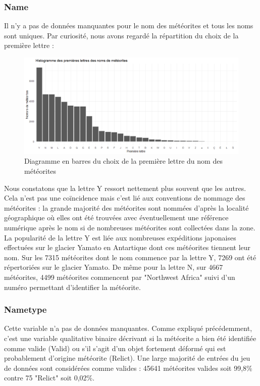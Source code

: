 \documentclass[12pt]{article}
\begin{document}
\subsubsection*{Name}
Il n'y a pas de données manquantes pour le nom des météorites et tous les noms sont uniques. Par curiosité, nous avons regardé la répartition du choix de la première lettre :
\begin{figure}[H]
\centering
\includegraphics[width=16cm]{Images/exploration/name_barplot_lettres.png}
\caption{Diagramme en barres du choix de la première lettre du nom des météorites}
\end{figure}
Nous constatons que la lettre Y ressort nettement plus souvent que les autres. Cela n'est pas une coïncidence mais c'est lié aux conventions de nommage des météorites \cite{Convention_nommage_meteorites} : la grande majorité des météorites sont nommées d'après la localité géographique où elles ont été trouvées avec éventuellement une référence numérique après le nom si de nombreuses météorites sont collectées dans la zone. La popularité de la lettre Y est liée aux nombreuses expéditions japonaises effectuées sur le glacier Yamato en Antartique dont ces météorites tiennent leur nom. Sur les 7315 météorites dont le nom commence par la lettre Y, 7269 ont été répertoriées sur le glacier Yamato. De même pour la lettre N, sur 4667 météorites, 4499 météorites commencent par "Northwest Africa" suivi d'un numéro permettant d'identifier la météorite.
\subsubsection*{Nametype}
Cette variable n'a pas de données manquantes. Comme expliqué précédemment, c'est une variable qualitative binaire décrivant si la météorite a bien été identifiée comme valide (Valid) ou s'il s'agit d'un objet fortement déformé qui est probablement d'origine météorite (Relict). Une large majorité de entrées du jeu de données sont considérées comme valides : 45641 météorites valides soit 99,8\% contre 75 "Relict" soit 0,02\%.
\end{document}
